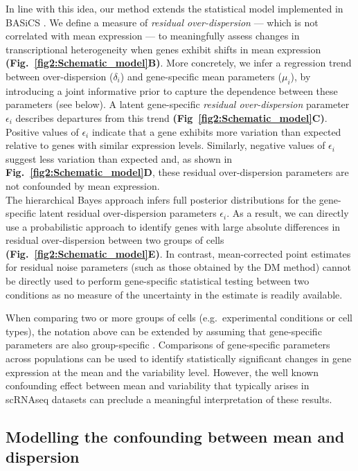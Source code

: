 In line with this idea, our method extends the statistical model implemented in BASiCS \citep{Vallejos2015BASiCS, Vallejos2016}. We define a measure of \textit{residual over-dispersion} --- which is not correlated with mean expression --- to meaningfully assess changes in transcriptional heterogeneity when genes exhibit shifts in mean expression \textbf{(Fig.~\ref{fig2:Schematic_model}B)}. More concretely, we infer a regression trend between over-dispersion ($\delta_i$) and gene-specific mean parameters ($\mu_i$), by introducing a joint informative prior to capture the dependence between these parameters (see below). A latent gene-specific {\it residual over-dispersion} parameter $\epsilon_i$ describes departures from this trend \textbf{(Fig~\ref{fig2:Schematic_model}C)}. Positive values of $\epsilon_i$ indicate that a gene exhibits more variation than expected relative to genes with similar expression levels. Similarly, negative values of $\epsilon_i$ suggest less variation than expected and, as shown in \textbf{Fig.~\ref{fig2:Schematic_model}D}, these residual over-dispersion parameters are not confounded by mean expression. \\

The hierarchical Bayes approach infers full posterior distributions for the gene-specific latent residual over-dispersion parameters $\epsilon_i$. As a result, we can directly use a probabilistic approach to identify genes with large absolute differences in residual over-dispersion between two groups of cells \textbf{(Fig.~\ref{fig2:Schematic_model}E)}. In contrast, mean-corrected point estimates for residual noise parameters (such as those obtained by the DM method) cannot be directly used to perform gene-specific statistical testing between two conditions as no measure of the uncertainty in the estimate is readily available.

When comparing two or more groups of cells (e.g.~experimental conditions or cell types), the notation above can be extended by assuming that gene-specific parameters are also group-specific \citep[as in][]{Vallejos2016}. Comparisons of gene-specific parameters across populations can be used to identify statistically significant changes in gene expression at the mean and the variability level. However, the well known confounding effect between mean and variability that typically arises in scRNAseq datasets \citep{Brennecke2013} can preclude a meaningful interpretation of these results.  

\subsection{Modelling the confounding between mean and dispersion} \label{sec2:extended_BASiCS}

